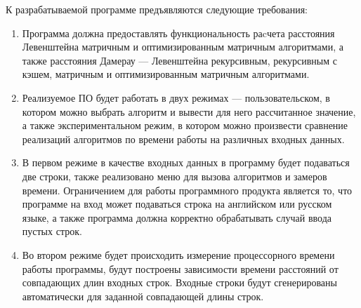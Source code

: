 К разрабатываемой программе предъявляются следующие требования:
\begin{enumerate}
\item Программа должна предоставлять функциональность раcчета расстояния Левенштейна матричным и оптимизированным матричным алгоритмами, а также расстояния Дамерау --- Левенштейна рекурсивным, рекурсивным с кэшем, матричным и оптимизированным матричным алгоритмами.

\item Реализуемое ПО будет работать в двух режимах --- пользовательском, в
котором можно выбрать алгоритм и вывести для него рассчитанное значение,
а также экспериментальном режим, в котором можно произвести сравнение реализаций алгоритмов по времени работы на различных входных данных.

\item В первом режиме в качестве входных данных в программу будет подаваться две строки, также реализовано меню для вызова алгоритмов и замеров времени. Ограничением для работы программного продукта является то, что программе на вход может подаваться строка на английском или русском языке, а также программа должна корректно обрабатывать случай ввода пустых строк.
\item Во втором режиме будет происходить измерение процессорного времени работы программы, будут построены зависимости времени расстояний от совпадающих длин входных строк. Входные строки будут сгенерированы автоматически для заданной совпадающей длины строк.
\end{enumerate}



